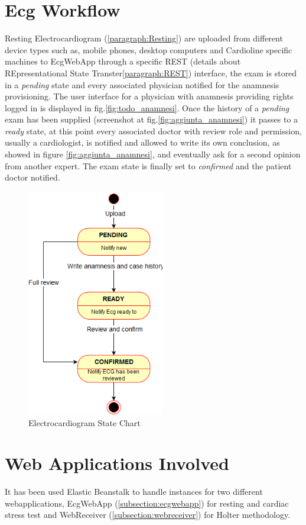 \section{Ecg Workflow}
Resting Electrocardiogram (\ref{paragraph:Resting}) are uploaded from different device types such as, mobile phones, desktop computers and Cardioline specific machines to EcgWebApp through a specific REST (details about REpresentational State Transter\ref{paragraph:REST}) interface, the exam is stored in a \textit{pending} state and every associated physician notified for the anamnesis provisioning.
The user interface for a physician with anamnesis providing rights logged in is displayed in fig.\ref{fig:todo_anamnesi}.
Once the history of a \textit{pending} exam has been supplied (screenshot at fig.\ref{fig:aggiunta_anamnesi}) it passes to a \textit{ready} state, at this point every associated doctor with review role and permission, usually a cardiologist, is notified and allowed to write its own conclusion, as showed in figure \ref{fig:aggiunta_anamnesi}, and eventually ask for a second opinion from another expert. The exam state is finally set to \textit{confirmed} and the patient doctor notified.
\begin{figure}[h]
    \centering
    \includegraphics[width=6cm]{img/ECGstatechart}
    \caption{Electrocardiogram State Chart}
    \label{fig:ECGstatechart}
\end{figure}
\clearpage

\section{Web Applications Involved}
It has been used Elastic Beanstalk to handle instances for two different webapplications, EcgWebApp (\ref{subsection:ecgwebapp}) for resting and cardiac stress test and WebReceiver (\ref{subsection:webreceiver}) for Holter methodology.
